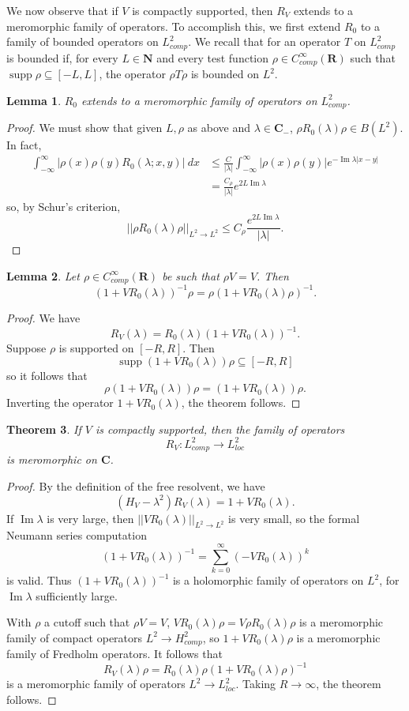 \documentclass[12pt]{report}
\newcommand{\NN}{\mathbf{N}}
\newcommand{\RR}{\mathbf{R}}
\newcommand{\CC}{\mathbf{C}}
\DeclareMathOperator{\supp}{supp}
\renewcommand{\Im}{\operatorname{Im}}
\newtheorem{theorem}{Theorem}[chapter]
\newtheorem{lemma}[theorem]{Lemma}
\theoremstyle{definition}
\begin{document}
We now observe that if $V$ is compactly supported, then $R_V$ extends to a meromorphic family of operators.
To accomplish this, we first extend $R_0$ to a family of bounded operators on $L^2_{comp}$.
We recall that for an operator $T$ on $L^2_{comp}$ is bounded if, for every $L \in \NN$ and every test function $\rho \in C^\infty_{comp}(\RR)$ such that $\supp \rho \subseteq [-L, L]$, the operator $\rho T\rho$ is bounded on $L^2$.
\begin{lemma}
$R_0$ extends to a meromorphic family of operators on $L^2_{comp}$.
\end{lemma}
\begin{proof}
We must show that given $L, \rho$ as above and $\lambda \in \CC_-$, $\rho R_0(\lambda) \rho \in B(L^2)$. In fact,
\begin{align*}
  \int_{-\infty}^\infty |\rho(x)\rho(y)R_0(\lambda; x, y)| ~dx &\leq \frac{C}{|\lambda|} \int_{-\infty}^\infty |\rho(x)\rho(y)| e^{-\Im \lambda|x-y|}\\
  &= \frac{C_\rho}{|\lambda|} e^{2L \Im \lambda}
\end{align*}
so, by Schur's criterion,
$$||\rho R_0(\lambda) \rho||_{L^2 \to L^2} \leq C_\rho \frac{e^{2L\Im \lambda}}{|\lambda|}.$$
\end{proof}

\begin{lemma}
Let $\rho \in C^\infty_{comp}(\RR)$ be such that $\rho V = V$. Then
$$(1 + VR_0(\lambda))^{-1}\rho = \rho(1 + VR_0(\lambda)\rho)^{-1}.$$
\end{lemma}
\begin{proof}
  We have
  $$R_V(\lambda) = R_0(\lambda)(1 + VR_0(\lambda))^{-1}.$$
  Suppose $\rho$ is supported on $[-R, R]$. Then
  $$\supp (1 + VR_0(\lambda))\rho \subseteq [-R, R]$$
  so it follows that
  $$\rho(1 + VR_0(\lambda))\rho = (1 + VR_0(\lambda))\rho.$$
  Inverting the operator $1 + VR_0(\lambda)$, the theorem follows.
\end{proof}

\begin{theorem}
\label{meromorphic continuation with compact support}
If $V$ is compactly supported, then the family of operators
$$R_V: L^2_{comp} \to L^2_{loc}$$
is meromorphic on $\CC$.
\end{theorem}
\begin{proof}
By the definition of the free resolvent, we have
$$(H_V - \lambda^2)R_V(\lambda) = 1 + VR_0(\lambda).$$
If $\Im \lambda$ is very large, then $||VR_0(\lambda)||_{L^2 \to L^2}$ is very small, so the formal Neumann series computation
$$(1 + VR_0(\lambda))^{-1} = \sum_{k=0}^\infty (-VR_0(\lambda))^k$$
is valid. Thus $(1 + VR_0(\lambda))^{-1}$ is a holomorphic family of operators on $L^2$, for $\Im \lambda$ sufficiently large.

With $\rho$ a cutoff such that $\rho V = V$, $VR_0(\lambda)\rho = V\rho R_0(\lambda)\rho$ is a meromorphic family of compact operators $L^2 \to H^2_{comp}$, so $1 + VR_0(\lambda)\rho$ is a meromorphic family of Fredholm operators. It follows that
$$R_V(\lambda)\rho = R_0(\lambda)\rho(1 + VR_0(\lambda)\rho)^{-1}$$ is a meromorphic family of operators $L^2 \to L^2_{loc}$. Taking $R \to \infty$, the theorem follows.
\end{proof}
\end{document}
